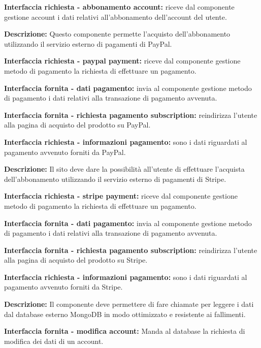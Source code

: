 \begin{listaPersonale}[]{}
    \textbf{Interfaccia richiesta - abbonamento account:} riceve dal componente gestione account i dati relativi all'abbonamento dell'account del utente.



    \textbf{Descrizione:} Questo componente permette l'acquisto dell'abbonamento utilizzando il servizio esterno di pagamenti di PayPal.

    \textbf{Interfaccia richiesta - paypal payment:} riceve dal componente gestione metodo di pagamento la richiesta di effettuare un pagamento.

    \textbf{Interfaccia fornita - dati pagamento:} invia al componente gestione metodo di pagamento i dati relativi alla transazione di pagamento avvenuta.

    \textbf{Interfaccia fornita - richiesta pagamento subscription:} reindirizza l'utente alla pagina di acquisto del prodotto su PayPal.

    \textbf{Interfaccia richiesta - informazioni pagamento:} sono i dati riguardati al pagamento avvenuto forniti da PayPal.



    \textbf{Descrizione:} Il sito deve dare la possibilità all'utente di effettuare l'acquista dell'abbonamento utilizzando il servizio esterno di pagamenti di Stripe.

    \textbf{Interfaccia richiesta - stripe payment:} riceve dal componente gestione metodo di pagamento la richiesta di effettuare un pagamento.

    \textbf{Interfaccia fornita - dati pagamento:} invia al componente gestione metodo di pagamento i dati relativi alla transazione di pagamento avvenuta.

    \textbf{Interfaccia fornita - richiesta pagamento subscription:} reindirizza l'utente alla pagina di acquisto del prodotto su Stripe.

    \textbf{Interfaccia richiesta - informazioni pagamento:} sono i dati riguardati al pagamento avvenuto forniti da Stripe.



    \textbf{Descrizione:} Il componente deve permettere di fare chiamate per leggere i dati dal database esterno MongoDB in modo ottimizzato e resistente ai fallimenti.

    \textbf{Interfaccia fornita - modifica account:} Manda al database la richiesta di modifica dei dati di un account.


\end{listaPersonale}

